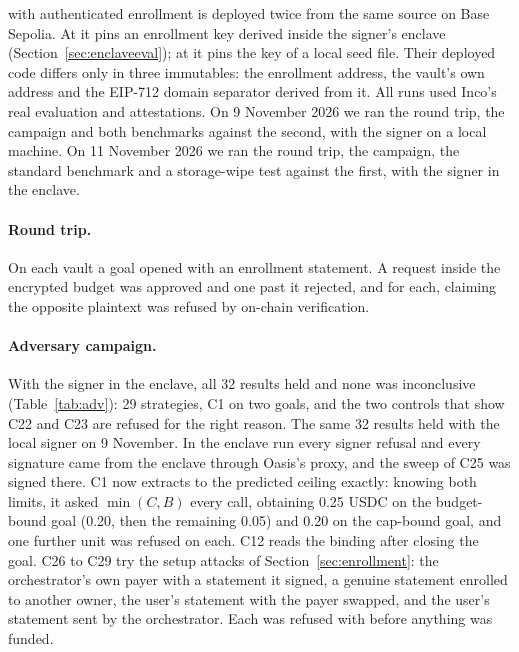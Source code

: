  with authenticated enrollment is deployed twice from the same source on Base Sepolia. At 
it pins an enrollment key derived inside the signer's enclave (Section~\ref{sec:enclaveeval}); at  it pins
the key of a local seed file. Their deployed code differs only in three immutables: the enrollment address, the vault's own address and the EIP-712 domain
separator derived from it. All runs used Inco's real evaluation and attestations. On 9 November 2026 we ran the round trip, the campaign and both
benchmarks against the second, with the signer on a local machine. On 11 November 2026 we ran the round trip, the campaign, the standard benchmark and a
storage-wipe test against the first, with the signer in the enclave.

\paragraph{Round trip.} On each vault a goal opened with an enrollment statement. A request inside the encrypted budget was approved and one past it
rejected, and for each, claiming the opposite plaintext was refused by on-chain verification.

\paragraph{Adversary campaign.} With the signer in the enclave, all 32 results held and none was inconclusive (Table~\ref{tab:adv}): 29 strategies, C1 on
two goals, and the two controls that show C22 and C23 are refused for the right reason. The same 32 results held with the local signer on 9 November. In the
enclave run every signer refusal and every signature came from the enclave through Oasis's proxy, and the sweep of C25 was signed there. C1 now extracts to the predicted ceiling exactly: knowing both limits, it asked
$\min(C, B)$ every call, obtaining 0.25 USDC on the budget-bound goal (0.20, then the remaining 0.05) and 0.20 on the cap-bound goal, and one further unit
was refused on each. C12 reads the binding after closing the goal. C26 to C29 try the setup attacks of Section~\ref{sec:enrollment}: the orchestrator's own
payer with a statement it signed, a genuine statement enrolled to another owner, the user's statement with the payer swapped, and the user's statement sent
by the orchestrator. Each was refused with  before anything was funded.

